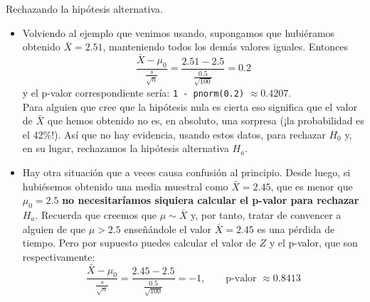 \documentclass[
  9pt,
  ignorenonframetext,
]{beamer}
\begin{document}
\begin{frame}[fragile]{Rechazando la hipótesis alternativa.}
\protect\hypertarget{rechazando-la-hipotesis-alternativa.}{}

\begin{itemize}
\item
  Volviendo al ejemplo que venimos usando, supongamos que hubiéramos
  obtenido \(\bar X = 2.51\), manteniendo todos los demás valores
  iguales. Entonces \[
  \dfrac{\bar X - \mu_0}{\frac{s}{\sqrt{n}}} = 
  \dfrac{2.51 - 2.5}{\frac{0.5}{\sqrt{100}}} = 0.2
  \] y el p-valor correspondiente sería: \texttt{1\ -\ pnorm(0.2)}
  \(\approx 0.4207\).\\
  Para alguien que cree que la hipótesis nula es cierta eso significa
  que el valor de \(\bar X\) que hemos obtenido no es, en absoluto, una
  sorpresa (¡la probabilidad es el 42\%!). Así que no hay evidencia,
  usando estos datos, para rechazar \(H_0\) y, en su lugar, rechazamos
  la hipótesis alternativa \(H_a\).
\item
  Hay otra situación que a veces causa confusión al principio. Desde
  luego, si hubiésemos obtenido una media muestral como
  \(\bar X = 2.45\), que es menor que \(\mu_0 = 2.5\) \textbf{no
  necesitaríamos siquiera calcular el p-valor para rechazar \(H_a\)}.
  Recuerda que creemos que \(\mu \sim \bar X\) y, por tanto, tratar de
  convencer a alguien de que \(\mu > 2.5\) enseñándole el valor
  \(\bar X = 2.45\) es una pérdida de tiempo. Pero por supuesto puedes
  calcular el valor de \(Z\) y el p-valor, que son respectivamente: \[
  \dfrac{\bar X - \mu_0}{\frac{s}{\sqrt{n}}} = 
  \dfrac{2.45 - 2.5}{\frac{0.5}{\sqrt{100}}} = -1, 
  \qquad \text{p-valor } \approx 0.8413
  \]
\end{itemize}

\end{frame}
\end{document}
